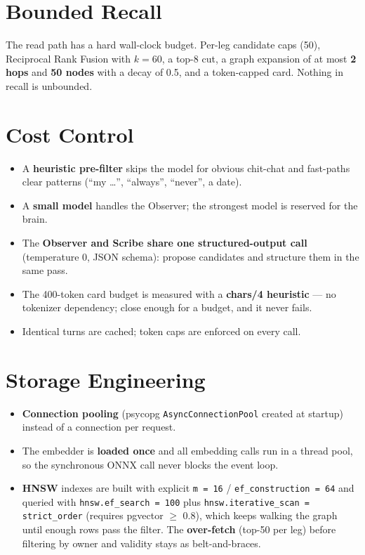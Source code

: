 \section{Bounded Recall}
The read path has a hard wall-clock budget. Per-leg candidate caps (50), Reciprocal Rank Fusion with
$k=60$, a top-8 cut, a graph expansion of at most \textbf{2 hops} and \textbf{50 nodes} with a decay of
0.5, and a token-capped card. Nothing in recall is unbounded.

\section{Cost Control}
\begin{itemize}
  \item A \textbf{heuristic pre-filter} skips the model for obvious chit-chat and fast-paths clear
  patterns (``my \ldots'', ``always'', ``never'', a date).
  \item A \textbf{small model} handles the Observer; the strongest model is reserved for the brain.
  \item The \textbf{Observer and Scribe share one structured-output call} (temperature 0, JSON
  schema): propose candidates and structure them in the same pass.
  \item The 400-token card budget is measured with a \textbf{chars/4 heuristic} --- no tokenizer
  dependency; close enough for a budget, and it never fails.
  \item Identical turns are cached; token caps are enforced on every call.
\end{itemize}

\section{Storage Engineering}
\begin{itemize}
  \item \textbf{Connection pooling} (psycopg \texttt{AsyncConnectionPool} created at startup)
  instead of a connection per request.
  \item The embedder is \textbf{loaded once} and all embedding calls run in a thread pool, so the
  synchronous ONNX call never blocks the event loop.
  \item \textbf{HNSW} indexes are built with explicit \texttt{m = 16} / \texttt{ef\_construction = 64}
  and queried with \texttt{hnsw.ef\_search = 100} plus \texttt{hnsw.iterative\_scan = strict\_order}
  (requires pgvector $\geq$ 0.8), which keeps walking the graph until enough rows pass the filter.
  The \textbf{over-fetch} (top-50 per leg) before filtering by owner and validity stays as
  belt-and-braces.
\end{itemize}

